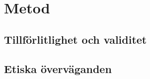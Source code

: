 \chapter{Metod}

\lipsum[20]

\section{Tillförlitlighet och validitet}

\lipsum[21-22]

\section{Etiska överväganden}

\lipsum[23]
